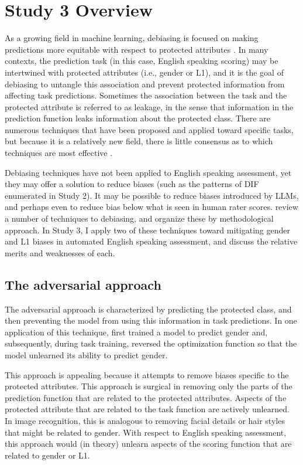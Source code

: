 \documentclass [PhD] {uclathes}
\begin{document}
\section{Study 3 Overview}

As a growing field in machine learning, debiasing is focused on making predictions more equitable with respect to protected attributes \citep{elazar2018adversarial}. In many contexts, the prediction task (in this case, English speaking scoring) may be intertwined with protected attributes (i.e., gender or L1), and it is the goal of debiasing to untangle this association and prevent protected information from affecting task predictions. Sometimes the association between the task and the protected attribute is referred to as leakage, in the sense that information in the prediction function leaks information about the protected class. There are numerous techniques that have been proposed and applied toward specific tasks, but because it is a relatively new field, there is little consensus as to which techniques are most effective \citep{sun2019mitigating}. 

Debiasing techniques have not been applied to English speaking assessment, yet they may offer a solution to reduce biases (such as the patterns of DIF enumerated in Study 2). It may be possible to reduce biases introduced by LLMs, and perhaps even to reduce bias below what is seen in human rater scores. \citet{sun2019mitigating} review a number of techniques to debiasing, and organize these by methodological approach. In Study 3, I apply two of these techniques toward mitigating gender and L1 biases in automated English speaking assessment, and discuss the relative merits and weaknesses of each. 

\subsection{The adversarial approach}

The adversarial approach is characterized by predicting the protected class, and then preventing the model from using this information in task predictions. In one application of this technique, \citet{wang2019balanced} first trained a model to predict gender and, subsequently, during task training, reversed the optimization function so that the model unlearned its ability to predict gender. 

This approach is appealing because it attempts to remove biases specific to the protected attributes. This approach is surgical in removing only the parts of the prediction function that are related to the protected attributes. Aspects of the protected attribute that are related to the task function are actively unlearned. In image recognition, this is analogous to removing facial details or hair styles that might be related to gender. With respect to English speaking assessment, this approach would (in theory) unlearn aspects of the scoring function that are related to gender or L1. 
\end{document}
